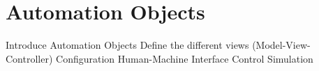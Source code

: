 \chapter{Automation Objects}
\label{automationobjects}

Introduce Automation Objects
Define the different views (Model-View-Controller)
	Configuration
	Human-Machine Interface
	Control
	Simulation